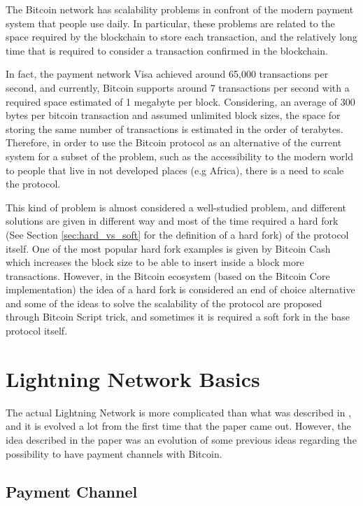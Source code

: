 The Bitcoin network has scalability problems in confront of the modern payment system that people use daily.
In particular, these problems are related to the space required by the blockchain to store each transaction,
and the relatively long time that is required to consider a transaction confirmed in the blockchain.

In fact, the payment network Visa achieved around 65,000\cite{visa-sheet} transactions per second, and currently,
Bitcoin supports around 7 transactions per second with a required space estimated of 1 megabyte per block. Considering,
an average of 300 bytes per bitcoin transaction and assumed unlimited block sizes, the space for storing the same number
of transactions is estimated in the order of terabytes\cite{lightning-network-paper}. Therefore, in order to use the Bitcoin
protocol as an alternative of the current system for a subset of the problem, such as the accessibility to the modern world
to people that live in not developed places (e.g Africa), there is a need to scale the protocol.

This kind of problem is almost considered a well-studied problem, and different solutions are given in different
way and most of the time required a hard fork (See Section \ref{sec:hard_vs_soft} for the definition of a hard fork) of the protocol itself.
One of the most popular hard fork examples is given by Bitcoin Cash which increases the block size to be able to insert
inside a block more transactions.
However, in the Bitcoin ecosystem (based on the Bitcoin Core implementation) the idea of a hard fork is considered an
end of choice alternative and some of the ideas to solve the scalability of the protocol are proposed through Bitcoin Script trick,
and sometimes it is required a soft fork in the base protocol itself.

\section{Lightning Network Basics}

The actual Lightning Network is more complicated than what was described in \cite{lightning-network-paper}, and it is
evolved a lot from the first time that the paper came out. However, the idea described in the paper was an evolution
of some previous ideas regarding the possibility to have payment channels with Bitcoin.

\subsection{Payment Channel}

